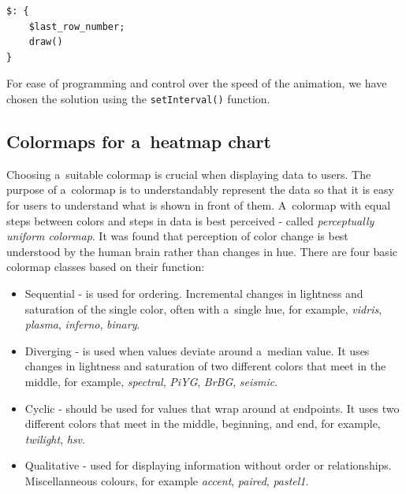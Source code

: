 \begin{lstlisting}[caption={Svelte reactive statement for redrawing canvas element using \texttt{setInterval()}. The reactive statement updates on every \texttt{\$last\_row\_number} store update.},label=code.reactivestatement2]
$: {
    $last_row_number;
    draw()
}
\end{lstlisting}

For ease of programming and control over the speed of the animation, we have chosen the solution using the \texttt{setInterval()} function. 

\subsection{Colormaps for a~heatmap chart}\label{txt.design.frontend.colormap}

Choosing a~suitable colormap is crucial when displaying data to users. The purpose of a~colormap is to understandably represent the data so that it is easy for users to understand what is shown in front of them. A~colormap with equal steps between colors and steps in data is best perceived - called \textit{perceptually uniform colormap}. It was found that perception of color change is best understood by the human brain rather than changes in hue. 
\newpage
There are four basic colormap classes based on their function:

\begin{itemize}
    \item Sequential - is used for ordering. Incremental changes in lightness and saturation of the single color, often with a~single hue, for example, \textit{vidris}, \textit{plasma}, \textit{inferno}, \textit{binary}.
    \item Diverging - is used when values deviate around a~median value. It uses changes in lightness and saturation of two different colors that meet in the middle, for example, \textit{spectral}, \textit{PiYG}, \textit{BrBG}, \textit{seismic}.
    \item Cyclic - should be used for values that wrap around at endpoints. It uses two different colors that meet in the middle, beginning, and end, for example, \textit{twilight}, \textit{hsv}.
    \item Qualitative - used for displaying information without order or relationships. Miscellanneous colours, for example \textit{accent}, \textit{paired}, \textit{pastel1}.
\end{itemize}

